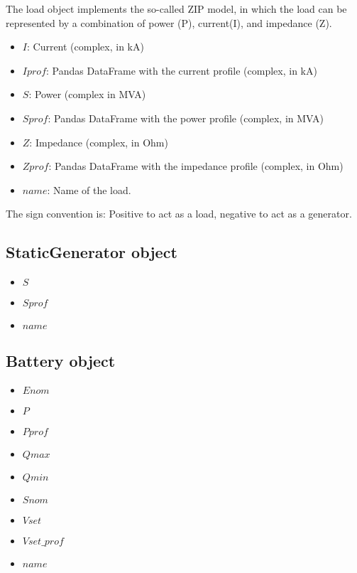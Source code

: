 \documentclass[11pt,fleqn]{book} %
\begin{document}
The load object implements the so-called ZIP model, in which the load can be represented by a combination of power (P), current(I), and impedance (Z).

\begin{itemize}
	\item $I$: Current (complex, in kA)
	\item $Iprof$: Pandas DataFrame with the current profile (complex, in kA)
	\item $S$: Power (complex in MVA)
	\item $Sprof$: Pandas DataFrame with the power profile (complex, in MVA)
	\item $Z$: Impedance (complex, in Ohm)
	\item $Zprof$: Pandas DataFrame with the impedance profile (complex, in Ohm)
	\item $name$: Name of the load.
\end{itemize}

The sign convention is: Positive to act as a load, negative to act as a generator.

\subsection{StaticGenerator object}

\begin{itemize}
	\item $S$
	\item $Sprof$
	\item $name$
\end{itemize}




\subsection{Battery object}

\begin{itemize}
	\item $Enom$
	\item $P$
	\item $Pprof$
	\item $Qmax$
	\item $Qmin$
	\item $Snom$
	\item $Vset$
	\item $Vset\_prof$
	\item $name$
\end{itemize}
\end{document}
